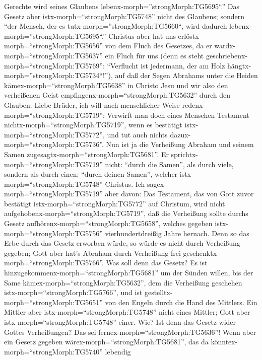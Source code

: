 Gerechte wird seines Glaubens lebenx-morph=''strongMorph:TG5695``.''
 Das Gesetz aber istx-morph=``strongMorph:TG5748'' nicht
des Glaubens; sondern ``der Mensch, der es
tutx-morph=''strongMorph:TG5660``, wird dadurch
lebenx-morph=''strongMorph:TG5695``.''  Christus aber hat
uns erlöstx-morph=``strongMorph:TG5656'' von dem Fluch des Gesetzes, da
er wardx-morph=``strongMorph:TG5637'' ein Fluch für uns (denn es steht
geschriebenx-morph=``strongMorph:TG5769'': ``Verflucht ist jedermann,
der am Holz hängtx-morph=''strongMorph:TG5734``!''),  auf
daß der Segen Abrahams unter die Heiden
kämex-morph=``strongMorph:TG5638'' in Christo Jesu und wir also den
verheißenen Geist empfingenx-morph=``strongMorph:TG5632'' durch den
Glauben.  Liebe Brüder, ich will nach menschlicher Weise
redenx-morph=``strongMorph:TG5719'': Verwirft man doch eines Menschen
Testament nichtx-morph=``strongMorph:TG5719'', wenn es bestätigt
istx-morph=``strongMorph:TG5772'', und tut auch nichts
dazux-morph=``strongMorph:TG5736''.  Nun ist ja die
Verheißung Abraham und seinem Samen
zugesagtx-morph=``strongMorph:TG5681''. Er
sprichtx-morph=``strongMorph:TG5719'' nicht: ``durch die Samen'', als
durch viele, sondern als durch einen: ``durch deinen Samen'', welcher
istx-morph=``strongMorph:TG5748'' Christus.  Ich
sagex-morph=``strongMorph:TG5719'' aber davon: Das Testament, das von
Gott zuvor bestätigt istx-morph=``strongMorph:TG5772'' auf Christum,
wird nicht aufgehobenx-morph=``strongMorph:TG5719'', daß die Verheißung
sollte durchs Gesetz aufhörenx-morph=``strongMorph:TG5658'', welches
gegeben istx-morph=``strongMorph:TG5756'' vierhundertdreißig Jahre
hernach.  Denn so das Erbe durch das Gesetz erworben würde,
so würde es nicht durch Verheißung gegeben; Gott aber hat's Abraham
durch Verheißung frei geschenktx-morph=``strongMorph:TG5766''.
 Was soll denn das Gesetz? Es ist
hinzugekommenx-morph=``strongMorph:TG5681'' um der Sünden willen, bis
der Same kämex-morph=``strongMorph:TG5632'', dem die Verheißung
geschehen istx-morph=``strongMorph:TG5766'', und ist
gestelltx-morph=``strongMorph:TG5651'' von den Engeln durch die Hand des
Mittlers.  Ein Mittler aber
istx-morph=``strongMorph:TG5748'' nicht eines Mittler; Gott aber
istx-morph=``strongMorph:TG5748'' einer.  Wie? Ist denn das
Gesetz wider Gottes Verheißungen? Das sei
fernex-morph=``strongMorph:TG5636''! Wenn aber ein Gesetz gegeben
wärex-morph=``strongMorph:TG5681'', das da
könntex-morph=``strongMorph:TG5740'' lebendig
